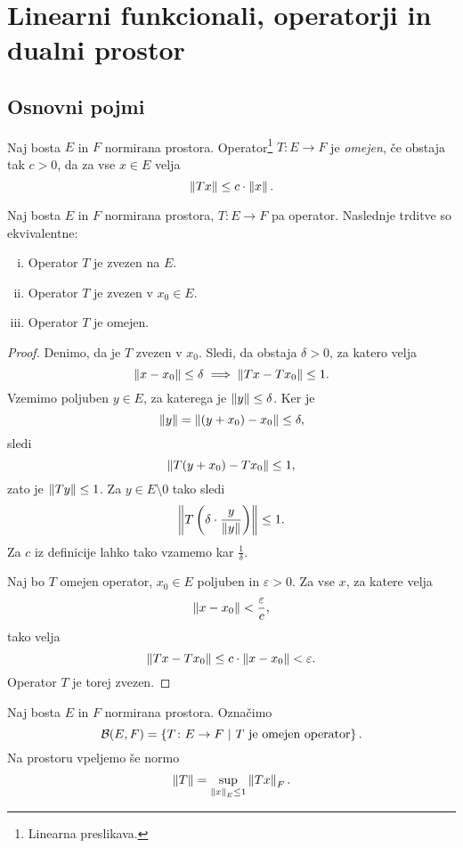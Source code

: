 \section{Linearni funkcionali, operatorji in dualni prostor}

\subsection{Osnovni pojmi}

\begin{definicija}
Naj bosta $E$ in $F$ normirana prostora.
Operator\footnote{Linearna preslikava.} $T \colon E \to F$ je
\emph{omejen}, če obstaja tak $c > 0$, da za
vse $x \in E$ velja
\[
\left\lVert Tx\right\rVert \leq c \cdot \left\lVert x\right\rVert.
\]
\end{definicija}

\begin{izrek}
Naj bosta $E$ in $F$ normirana prostora, $T \colon E \to F$ pa
operator. Naslednje trditve so ekvivalentne:

\begin{enumerate}[i)]
\item Operator $T$ je zvezen na $E$.
\item Operator $T$ je zvezen v $x_0 \in E$.
\item Operator $T$ je omejen.
\end{enumerate}
\end{izrek}

\begin{proof}
Denimo, da je $T$ zvezen v $x_0$. Sledi, da obstaja $\delta > 0$,
za katero velja
\[
\left\lVert x - x_0\right\rVert \leq \delta \implies \left\lVert Tx - Tx_0\right\rVert \leq 1.
\]
Vzemimo poljuben $y \in E$, za katerega je $\left\lVert y\right\rVert \leq \delta$.
Ker je
\[
\left\lVert y\right\rVert = \left\lVert (y+x_0) - x_0\right\rVert \leq \delta,
\]
sledi
\[
\left\lVert T(y + x_0) - Tx_0\right\rVert \leq 1,
\]
zato je $\left\lVert Ty\right\rVert \leq 1$. Za $y \in E \setminus 0$ tako sledi
\[
\left\lVert T\left(\delta \cdot \frac{y}{\left\lVert y\right\rVert}\right)\right\rVert \leq 1.
\]
Za $c$ iz definicije lahko tako vzamemo kar $\frac{1}{\delta}$.

Naj bo $T$ omejen operator, $x_0 \in E$ poljuben in
$\varepsilon > 0$. Za vse $x$, za katere velja
\[
\left\lVert x - x_0\right\rVert < \frac{\varepsilon}{c},
\]
tako velja
\[
\left\lVert Tx - Tx_0\right\rVert \leq c \cdot \left\lVert x - x_0\right\rVert < \varepsilon.
\]
Operator $T$ je torej zvezen.
\end{proof}

\begin{definicija}
Naj bosta $E$ in $F$ normirana prostora. Označimo
\[
\mathcal{B}(E,F) =
\left\{T \colon E \to F~\middle\vert~\text{$T$ je omejen operator}\right\}.
\]
Na prostoru vpeljemo še normo
\[
\left\lVert T\right\rVert = \sup_{\left\lVert x\right\rVert_E \leq 1} \left\lVert Tx\right\rVert_F.
\]
\end{definicija}

